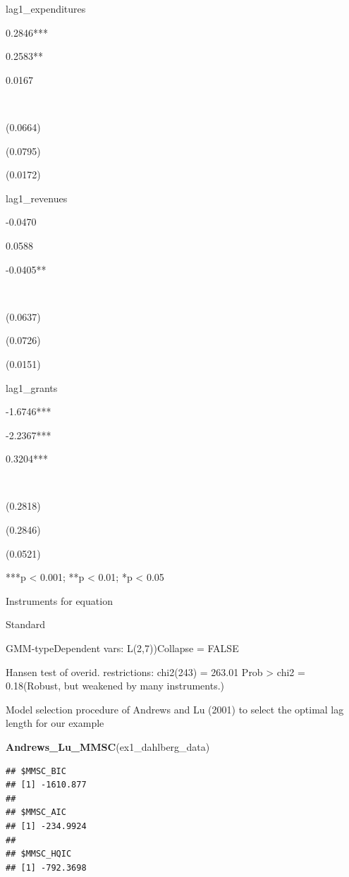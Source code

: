 \documentclass[
]{book}
\newenvironment{Shaded}{\begin{snugshade}}{\end{snugshade}}
\newcommand{\FunctionTok}[1]{\textcolor[rgb]{0.13,0.29,0.53}{\textbf{#1}}}
\newcommand{\NormalTok}[1]{#1}
\begin{document}
lag1\_expenditures

0.2846***

0.2583**

0.0167

~

(0.0664)

(0.0795)

(0.0172)

lag1\_revenues

-0.0470

0.0588

-0.0405**

~

(0.0637)

(0.0726)

(0.0151)

lag1\_grants

-1.6746***

-2.2367***

0.3204***

~

(0.2818)

(0.2846)

(0.0521)

***p \textless{} 0.001; **p \textless{} 0.01; *p \textless{} 0.05

Instruments for equation

Standard

GMM-typeDependent vars: L(2,7))Collapse = FALSE

Hansen test of overid. restrictions: chi2(243) = 263.01 Prob \textgreater{} chi2 = 0.18(Robust, but weakened by many instruments.)

Model selection procedure of Andrews and Lu (2001) to select the optimal lag length for our example

\begin{Shaded}
\begin{Highlighting}[]
\FunctionTok{Andrews\_Lu\_MMSC}\NormalTok{(ex1\_dahlberg\_data)}
\end{Highlighting}
\end{Shaded}

\begin{verbatim}
## $MMSC_BIC
## [1] -1610.877
## 
## $MMSC_AIC
## [1] -234.9924
## 
## $MMSC_HQIC
## [1] -792.3698
\end{verbatim}
\end{document}
